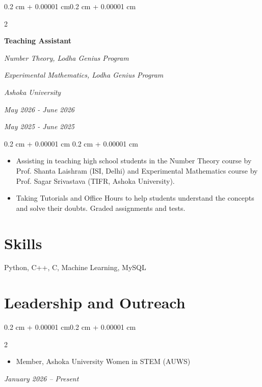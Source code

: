 \documentclass[10pt, letterpaper]{article}
\newenvironment{highlights}{
    \begin{itemize}[
        topsep=0.10 cm,
        parsep=0.10 cm,
        partopsep=0pt,
        itemsep=0pt,
        leftmargin=0.4 cm + 10pt
    ]
}{
    \end{itemize}
} %
\newenvironment{onecolentry}{
    \begin{adjustwidth}{
        0.2 cm + 0.00001 cm
    }{
        0.2 cm + 0.00001 cm
    }
}{
    \end{adjustwidth}
} %
\newenvironment{twocolentry}[2][]{
    \begin{adjustwidth}{0.2 cm + 0.00001 cm}{0.2 cm + 0.00001 cm}
    \def\secondColumn{#2}
    \setcolumnwidth{\fill, 4.5 cm}
    \begin{paracol}{2}
}{
    \switchcolumn \raggedleft \secondColumn
    \end{paracol}
    \end{adjustwidth}
} %
\begin{document}
    \begin{twocolentry}{
        \textit{Ashoka University}    
            
        \textit{May 2026 - June 2026}
        
        \textit{May 2025 - June 2025}}
        
        \textbf{Teaching Assistant}
            
            \textit{Number Theory, Lodha Genius Program}

            \textit{Experimental Mathematics, Lodha Genius Program}

        \end{twocolentry}

        \vspace{0.10 cm}
        \begin{onecolentry}
            \begin{highlights}
                \item Assisting in teaching high school students in the Number Theory course by Prof. Shanta Laishram (ISI, Delhi) and Experimental Mathematics course by Prof. Sagar Srivastava (TIFR, Ashoka University).
                \item Taking Tutorials and Office Hours to help students understand the concepts and solve their doubts. Graded assignments and tests.
            \end{highlights}
        \end{onecolentry}


        \vspace{0.2 cm}


    \section{Skills}
    Python, C++, C, Machine Learning, MySQL

    \section{Leadership and Outreach}

        \begin{twocolentry}{\textit{January 2026 -- Present}}
            \begin{highlights}
                \item Member, Ashoka University Women in STEM (AUWS)
            \end{highlights}
        \end{twocolentry}
\end{document}

